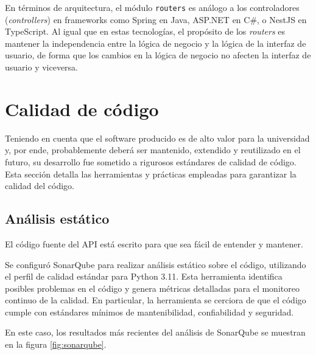 En términos de arquitectura, el módulo \texttt{routers} es análogo a los controladores (\textit{controllers}) en frameworks como Spring en Java, ASP.NET en C\#, o NestJS en TypeScript. Al igual que en estas tecnologías, el propósito de los \textit{routers} es mantener la independencia entre la lógica de negocio y la lógica de la interfaz de usuario, de forma que los cambios en la lógica de negocio no afecten la interfaz de usuario y viceversa.

\section{Calidad de código}
\label{sec:calidad_codigo}

Teniendo en cuenta que el software producido es de alto valor para la universidad y, por ende, probablemente deberá ser mantenido, extendido y reutilizado en el futuro, su desarrollo fue sometido a rigurosos estándares de calidad de código. Esta sección detalla las herramientas y prácticas empleadas para garantizar la calidad del código.

\subsection{Análisis estático}

El código fuente del \gls{API} está escrito para que sea fácil de entender y mantener.

Se configuró \gls{SonarQube} para realizar análisis estático sobre el código, utilizando el \gls{perfil de calidad} estándar para \gls{Python} 3.11. Esta herramienta identifica posibles problemas en el código y genera métricas detalladas para el monitoreo continuo de la calidad. En particular, la herramienta se cerciora de que el código cumple con estándares mínimos de mantenibilidad, confiabilidad y seguridad.

En este caso, los resultados más recientes del análisis de \gls{SonarQube} se muestran en la figura \ref{fig:sonarqube}.


